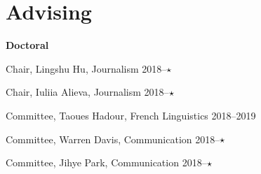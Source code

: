 
\section{Advising}

  \textbf{Doctoral}
    \begin{innerlist}
      \item Chair, Lingshu Hu, Journalism                                       \hfill 2018--$\star\hspace{1.5em}$
      \item Chair, Iuliia Alieva, Journalism                                    \hfill 2018--$\star\hspace{1.5em}$
      \item Committee, Taoues Hadour, French Linguistics                        \hfill 2018--2019
      \item Committee, Warren Davis, Communication                              \hfill 2018--$\star\hspace{1.5em}$
      \item Committee, Jihye Park, Communication                                \hfill 2018--$\star\hspace{1.5em}$
    \end{innerlist}\vspace{1em}


